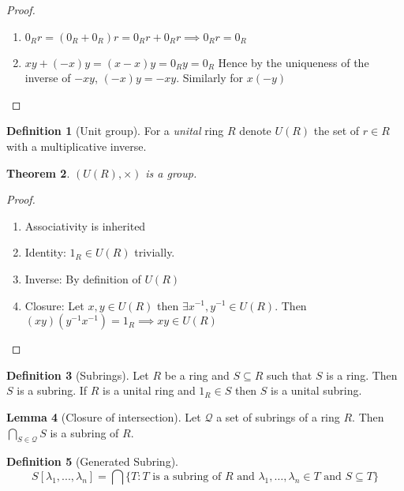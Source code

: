 \documentclass[11pt,a4paper]{article}
\newtheorem{theorem}{Theorem}[section]
\theoremstyle{definition}
\newtheorem{definition}[theorem]{Definition}
\newtheorem{lemma}[theorem]{Lemma}
\begin{document}
\begin{proof}
\begin{enumerate}
	\item $0_R r = (0_R + 0_R) r = 0_R r + 0_R r \implies 0_R r = 0_R$
	\item $xy + (-x)y = (x - x)y = 0_R y = 0_R$ Hence by the uniqueness of the inverse of $-xy$, $(-x)y = -xy$. Similarly for $x(-y)$
\end{enumerate}
\end{proof}

\begin{definition}[Unit group]
For a \emph{unital} ring $R$ denote $U(R)$ the set of $r \in R$ with a multiplicative inverse. 
\end{definition}

\begin{theorem}
$(U(R), \times)$ is a group.  
\end{theorem}

\begin{proof}
\begin{enumerate}
	\item Associativity is inherited
	\item Identity: $1_R \in U(R)$ trivially.
	\item Inverse: By definition of $U(R)$
	\item Closure: Let $x, y \in U(R)$ then $\exists x^{-1}, y^{-1} \in U(R)$. \newline Then $(xy)(y^{-1}x^{-1}) = 1_R \implies xy \in U(R)$
\end{enumerate}
\end{proof}

\begin{definition}[Subrings]
Let $R$ be a ring and $S \subseteq R$ such that $S$ is a ring. Then $S$ is a subring.
If $R$ is a unital ring and $1_R \in S$ then $S$ is a unital subring.
\end{definition}

\begin{lemma}[Closure of intersection]
Let $\mathcal{Q}$ a set of subrings of a ring $R$. Then $\bigcap\limits_{S \in \mathcal{Q}} S$ is a subring of $R$.
\end{lemma}

\begin{definition}[Generated Subring]
\[
	S[\lambda_1,..., \lambda_n] = \bigcap\{T : T \text{ is a subring of }R \text{ and } \lambda_1,\ldots, \lambda_n \in T \text{ and } S \subseteq T \}
\]
\end{definition}
\end{document}
